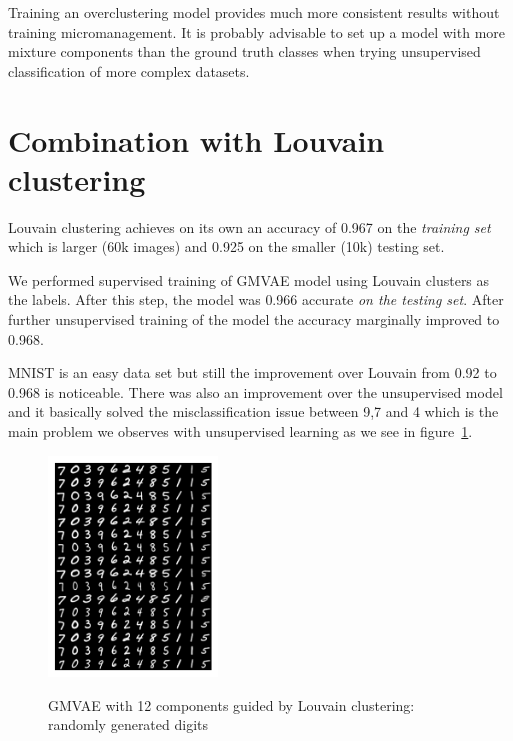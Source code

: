 \documentclass[11pt, a4paper]{report}
\theoremstyle{plain}
\theoremstyle{definition}
\theoremstyle{remark}
\begin{document}
Training an overclustering model provides much more consistent results without
training micromanagement. It is probably advisable to set up a model with more
mixture components than the ground truth classes when trying unsupervised
classification of more complex datasets.

\section{Combination with Louvain clustering}

Louvain clustering achieves on its own an accuracy of 0.967 on the
\emph{training set} which is larger (60k images) and 0.925 on the smaller (10k) 
testing set.

We performed supervised training of GMVAE model using Louvain clusters as the
labels.
After this step, the model was 0.966 accurate \emph{on the testing set}.
After further unsupervised training of the model the accuracy marginally
improved to 0.968.

MNIST is an easy data set but still the improvement over Louvain from 0.92 to 0.968 is
noticeable. There was also an improvement over the unsupervised model and it
basically solved the misclassification issue between 9,7 and 4 which is
the main problem we observes with unsupervised learning as we see in
figure~\ref{fig:mnist_us_louvain}.

\begin{figure}[h]
\centering
\includegraphics[width=0.4\textwidth]{images/gmmvae_mnist_us_louvain_samples1.png}
\label{fig:mnist_us_louvain_samples}
\caption{GMVAE with 12 components guided by Louvain clustering: randomly generated digits}
\label{fig:mnist_us_louvain}
\end{figure}
\end{document}

